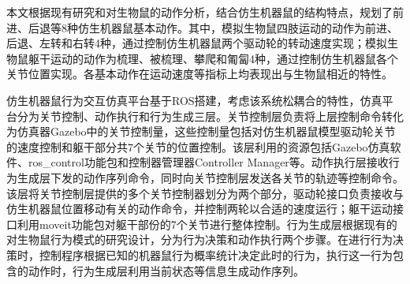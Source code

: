 %
%
%
%
%
%

\renewcommand{\thechapter}{结论}



本文根据现有研究和对生物鼠的动作分析，结合仿生机器鼠的结构特点，规划了前进、后退等8种仿生机器鼠基本动作。其中，模拟生物鼠四肢运动的动作为前进、后退、左转和右转4种，通过控制仿生机器鼠两个驱动轮的转动速度实现；模拟生物鼠躯干运动的动作为梳理、被梳理、攀爬和匍匐4种，通过控制仿生机器鼠各个关节位置实现。各基本动作在运动速度等指标上均表现出与生物鼠相近的特性。

仿生机器鼠行为交互仿真平台基于ROS搭建，考虑该系统松耦合的特性，仿真平台分为关节控制、动作执行和行为生成三层。关节控制层负责将上层控制命令转化为仿真器Gazebo中的关节控制量，这些控制量包括对仿生机器鼠模型驱动轮关节的速度控制和躯干部分共7个关节的位置控制。该层利用的资源包括Gazebo仿真软件、ros\_control功能包和控制器管理器Controller Manager等。动作执行层接收行为生成层下发的动作序列命令，同时向关节控制层发送各关节的轨迹等控制命令。该层将关节控制层提供的多个关节控制器划分为两个部分，驱动轮接口负责接收与仿生机器鼠位置移动有关的动作命令，并控制两轮以合适的速度运行；躯干运动接口利用moveit功能包对躯干部份的7个关节进行整体控制。行为生成层根据现有的对生物鼠行为模式的研究设计，分为行为决策和动作执行两个步骤。在进行行为决策时，控制程序根据已知的机器鼠行为概率统计决定此时的行为，执行这一行为包含的动作时，行为生成层利用当前状态等信息生成动作序列。

